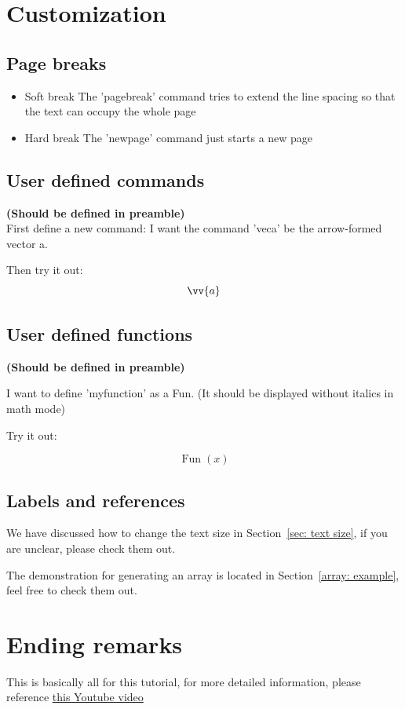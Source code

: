 \documentclass[a4paper, 12pt]{article}
\newcommand{\veca}{\[ \vv{a} \]}
\DeclareMathOperator{\MyFunction}{Fun}
\begin{document}
\section{Customization}
\subsection{Page breaks}
\begin{itemize}
    \item Soft break
    The 'pagebreak' command tries to extend the line spacing so that the text can occupy the whole page
    \item Hard break
    The 'newpage' command just starts a new page
\end{itemize}
\subsection{User defined commands}
\noindent \textbf{(Should be defined in preamble)} \\
First define a new command: I want the command 'veca' be the arrow-formed vector a.

Then try it out: \veca

\subsection{User defined functions}
\noindent \textbf{(Should be defined in preamble)}

\noindent I want to define 'myfunction' as a Fun. (It should be displayed without italics in math mode)

\noindent Try it out:

\[\MyFunction(x)\]

\subsection{Labels and references}
We have discussed how to change the text size in Section~\ref{sec: text size}, if you are unclear, please check them out.

The demonstration for generating an array is located in Section~\ref{array: example}, feel free to check them out.

\section{Ending remarks}
This is basically all for this tutorial, for more detailed information, please reference \href{https://www.youtube.com/watch?v=fCzF5gDy60g&list=WL&index=1}{this Youtube video}
\end{document}
